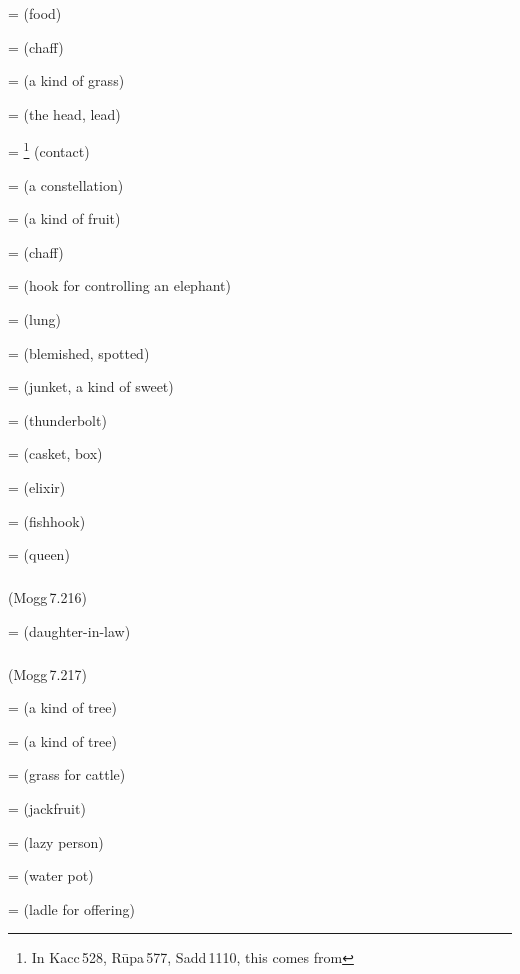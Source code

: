  =  (food)\par
{} =  (chaff)\par
{} =  (a kind of grass)\par
{} =  (the head, lead)\par
{} = \footnote{In Kacc\,528, R\=upa\,577, Sadd\,1110, this comes from } (contact)\par
{} =  (a constellation)\par
{} =  (a kind of fruit)\par
{} =  (chaff)\par
{} =  (hook for controlling an elephant)\par
{} =  (lung)\par
{} =  (blemished, spotted)\par
{} =  (junket, a kind of sweet)\par
{} =  (thunderbolt)\par
{} =  (casket, box)\par
{} =  (elixir)\par
{} =  (fishhook)\par
{} =  (queen)\par

\subparagraph*{} (Mogg\,7.216)\label{pacckx:dnisaka}

 =  (daughter-in-law)\par

\subparagraph*{} (Mogg\,7.217)\label{pacckx:asa}

 =  (a kind of tree)\par
{} =  (a kind of tree)\par
{} =  (grass for cattle)\par
{} =  (jackfruit)\par
{} =  (lazy person)\par
{} =  (water pot)\par
{} =  (ladle for offering)\par

